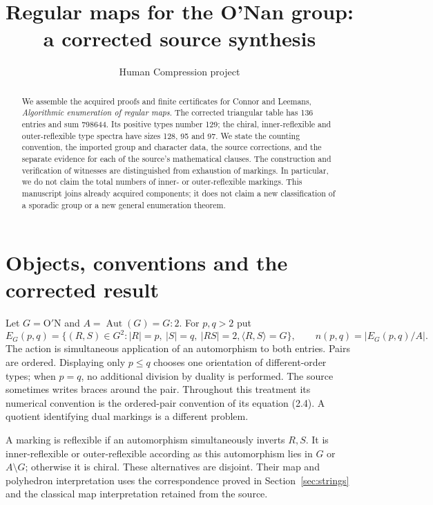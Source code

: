 \documentclass[11pt,a4paper]{article}
\title{Regular maps for the O'Nan group:\\a corrected source synthesis}
\author{Human Compression project}
\date{}
\newcommand{\Aut}{\operatorname{Aut}}
\newcommand{\ON}{\mathrm{O'N}}
\newcommand{\gen}[1]{\langle #1\rangle}
\begin{document}
\maketitle
\begin{abstract}
We assemble the acquired proofs and finite certificates for Connor and
Leemans, \emph{Algorithmic enumeration of regular maps}. The corrected
triangular table has 136 entries and sum 798644. Its positive types number
129; the chiral, inner-reflexible and outer-reflexible type spectra have
sizes 128, 95 and 97. We state the counting convention, the imported group
and character data, the source corrections, and the separate evidence for
each of the source's mathematical clauses. The construction and verification
of witnesses are distinguished from exhaustion of markings. In particular,
we do not claim the total numbers of inner- or outer-reflexible markings.
This manuscript joins already acquired components; it does not claim a
new classification of a sporadic group or a new general enumeration theorem.
\end{abstract}

\section{Objects, conventions and the corrected result}\label{sec:scope}
Let $G=\ON$ and $A=\Aut(G)=G:2$. For $p,q>2$ put
\[
 E_G(p,q)=\{(R,S)\in G^2:|R|=p,\ |S|=q,\ |RS|=2,
                         \gen{R,S}=G\},\qquad
 n(p,q)=|E_G(p,q)/A|.
\]
The action is simultaneous application of an automorphism to both entries.
Pairs are ordered. Displaying only $p\leq q$ chooses one orientation of
different-order types; when $p=q$, no additional division by duality is
performed. The source sometimes writes braces around the pair. Throughout
this treatment its numerical convention is the ordered-pair convention
of its equation (2.4). A quotient identifying dual markings is a different
problem.

A marking is reflexible if an automorphism simultaneously inverts $R,S$.
It is inner-reflexible or outer-reflexible according as this automorphism
lies in $G$ or $A\setminus G$; otherwise it is chiral. These alternatives
are disjoint. Their map and polyhedron interpretation uses the
correspondence proved in Section~\ref{sec:strings} and the classical
map interpretation retained from the source.
\end{document}
